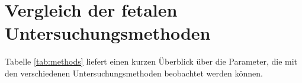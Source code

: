 \documentclass[10pt,a4paper,headinclude,twoside, plainheadsepline, open=right, numbers=noenddot, twocolumn]{article}
\begin{document}







\section{Vergleich der fetalen Untersuchungsmethoden}
\label{signal}

Tabelle \ref{tab:methods} liefert einen kurzen Überblick über die Parameter, die mit den verschiedenen Untersuchungsmethoden beobachtet werden können.
\end{document}
